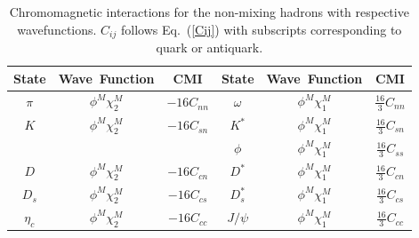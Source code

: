 \documentclass[prt,twocolumn,floatfix,nofootinbib]{revtex4}
\begin{document}
\renewcommand{\tabcolsep}{0.14cm}
\renewcommand{\arraystretch}{1.5}
\begin{table}[!htbp]
    \caption{Chromomagnetic interactions for the non-mixing hadrons with respective wavefunctions. $C_{ij}$ follows Eq.~(\ref{Cij}) with subscripts corresponding to quark or antiquark.}
    \label{tab:CMI}
    \begin{tabular}{cccccc}
        \hline\hline
        {\rm State}     &{\rm Wave\ Function}       &{\rm CMI}      &{\rm State}        &{\rm Wave\ Function}       &{\rm CMI} \\ \hline
        $\pi$           &$\phi^{M}\chi_{2}^{M}$     &$-16C_{nn}$    &$\omega$           &$\phi^{M}\chi_{1}^{M}$     &$\frac{16}{3}C_{nn}$ \\
        $K$             &$\phi^{M}\chi_{2}^{M}$     &$-16C_{sn}$    &$K^{\ast}$         &$\phi^{M}\chi_{1}^{M}$     &$\frac{16}{3}C_{sn}$ \\
                        &                           &               &$\phi$             &$\phi^{M}\chi_{1}^{M}$     &$\frac{16}{3}C_{ss}$ \\
        $D$             &$\phi^{M}\chi_{2}^{M}$     &$-16C_{cn}$    &$D^{\ast}$         &$\phi^{M}\chi_{1}^{M}$     &$\frac{16}{3}C_{cn}$ \\
        $D_{s}$         &$\phi^{M}\chi_{2}^{M}$     &$-16C_{cs}$    &$D_{s}^{\ast}$     &$\phi^{M}\chi_{1}^{M}$     &$\frac{16}{3}C_{cs}$ \\
        $\eta_{c}$      &$\phi^{M}\chi_{2}^{M}$     &$-16C_{cc}$    &$J/\psi$           &$\phi^{M}\chi_{1}^{M}$     &$\frac{16}{3}C_{cc}$ \\


\end{tabular}
\end{table}
\end{document}

